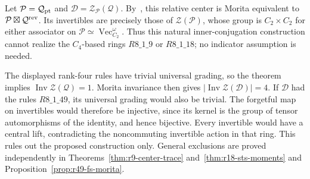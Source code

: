 \begin{remark}
Let $\mathcal P=\mathcal Q_{\rm pt}$ and
$\mathcal D=\mathcal Z_{\mathcal P}(\mathcal Q)$.
By~\cite[Remark~2.4(i)]{GNN}, this relative center is Morita equivalent
to $\mathcal P\boxtimes\mathcal Q^{\rm rev}$.
Its invertibles are precisely those of $\mathcal Z(\mathcal P)$,
whose group is $C_2\times C_2$ for either associator on
$\mathcal P\simeq\operatorname{Vec}_{C_2}^{\omega}$.
Thus this natural inner-conjugation construction cannot realize the
$C_4$-based rings $R8\_1\_9$ or $R8\_1\_18$; no indicator assumption
is needed.

The displayed rank-four rules have trivial universal grading, so the
theorem implies $\operatorname{Inv}\mathcal Z(\mathcal Q)=1$.
Morita invariance then gives
$|\operatorname{Inv}\mathcal Z(\mathcal D)|=4$.
If $\mathcal D$ had the rules $R8\_1\_49$, its universal grading
would also be trivial. The forgetful map on invertibles would therefore
be injective, since its kernel is the group of tensor automorphisms of
the identity, and hence bijective. Every invertible would have a central
lift, contradicting the noncommuting invertible action in that ring.
This rules out the proposed construction only. General exclusions are
proved independently in Theorems~\ref{thm:r9-center-trace}
and~\ref{thm:r18-sts-moments} and
Proposition~\ref{prop:r49-fs-morita}.
\end{remark}
